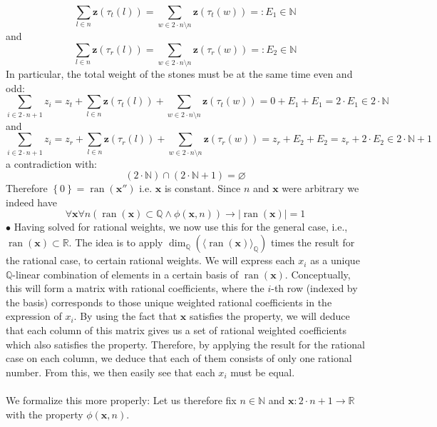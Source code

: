 \begin{solution}
    \[
        \sum_{l \in n} \mathbf{z}\left(\tau_t\left(l\right)\right) = \sum_{w \in 2 \cdot n \setminus n} \mathbf{z}\left(\tau_t\left(w\right)\right) =: E_1 \in \mathbb{N}
    \]
    and
    \[
        \sum_{l \in n} \mathbf{z}\left(\tau_r\left(l\right)\right) = \sum_{w \in 2 \cdot n \setminus n} \mathbf{z}\left(\tau_r\left(w\right)\right) =: E_2 \in \mathbb{N}
    \]
    In particular, the total weight of the stones must be at the same time even and odd:
    \[
        \sum_{i \in 2 \cdot n + 1} z_i = z_t + \sum_{l \in n} \mathbf{z}\left(\tau_t\left(l\right)\right) + \sum_{w \in 2 \cdot n \setminus n} \mathbf{z}\left(\tau_t\left(w\right)\right) = 0 + E_1 + E_1 = 2 \cdot E_1 \in 2 \cdot \mathbb{N}
    \]
    and
    \[
        \sum_{i \in 2 \cdot n + 1} z_i = z_r + \sum_{l \in n} \mathbf{z}\left(\tau_r\left(l\right)\right) + \sum_{w \in 2 \cdot n \setminus n} \mathbf{z}\left(\tau_r\left(w\right)\right) = z_r + E_2 + E_2 = z_r + 2 \cdot E_2 \in 2 \cdot \mathbb{N} + 1
    \]
    a contradiction with:
    \[
        \left(2 \cdot \mathbb{N}\right) \cap \left(2 \cdot \mathbb{N} + 1\right) = \varnothing
    \]
    Therefore \( \left\{0\right\}=\operatorname{ran}\left(\textbf{x}''\right) \) i.e. \( \textbf{x} \) is constant. Since \( n \) and \( \textbf{x} \) were arbitrary we indeed have
    \[
        \forall \textbf{x} \forall n \left( \operatorname{ran}\left(\textbf{x}\right) \subset \mathbb{Q} \wedge \phi\left(\textbf{x}, n\right) \right) \rightarrow |\operatorname{ran}\left(\textbf{x}\right)| = 1
    \]
    \( \bullet \) Having solved for rational weights, we now use this for the general case, i.e., \( \operatorname{ran}\left(\textbf{x}\right) \subset \mathbb{R} \). The idea is to apply \( \dim_{\mathbb{Q}}\left(\langle \operatorname{ran}\left(\textbf{x}\right) \rangle_{\mathbb{Q}}\right) \) times the result for the rational case, to certain rational weights. We will express each \( x_i \) as a unique \( \mathbb{Q} \)-linear combination of elements in a certain basis of \( \operatorname{ran}\left(\textbf{x}\right) \). Conceptually, this will form a matrix with rational coefficients, where the \( i \)-th row (indexed by the basis) corresponds to those unique weighted rational coefficients in the expression of \( x_i \). By using the fact that \( \textbf{x} \) satisfies the property, we will deduce that each column of this matrix gives us a set of rational weighted coefficients which also satisfies the property. Therefore, by applying the result for the rational case on each column, we deduce that each of them consists of only one rational number. From this, we then easily see that each \( x_i \) must be equal.
    \\\\
    We formalize this more properly: Let us therefore fix \( n \in \mathbb{N} \) and \( \mathbf{x}: 2 \cdot n + 1 \to \mathbb{R} \) with the property \( \phi\left(\mathbf{x}, n\right) \).


\end{solution}
